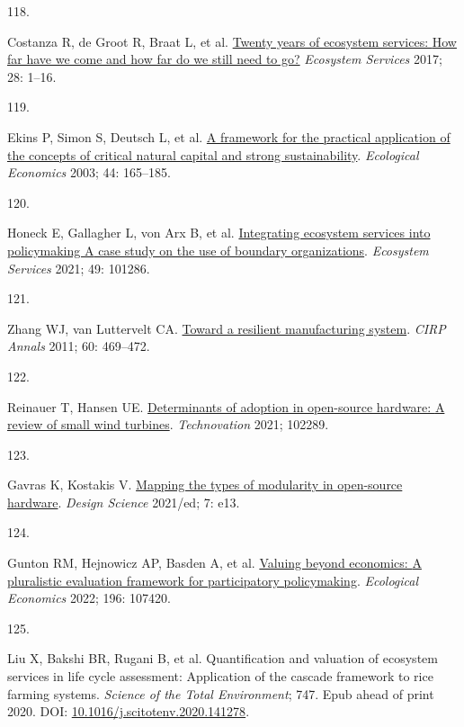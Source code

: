 \documentclass[
  12pt,
  a4paperpaper,
  onecolumn]{article}
\newlength{\cslhangindent}
\newlength{\csllabelwidth}
\newlength{\cslentryspacingunit} %
\newenvironment{CSLReferences}[2] %
 {%
  \setlength{\parindent}{0pt}
  \ifodd #1
  \let\oldpar\par
  \def\par{\hangindent=\cslhangindent\oldpar}
  \fi
  \setlength{\parskip}{#2\cslentryspacingunit}
 }%
 {}
\newcommand{\CSLLeftMargin}[1]{\parbox[t]{\csllabelwidth}{#1}}
\newcommand{\CSLRightInline}[1]{\parbox[t]{\linewidth - \csllabelwidth}{#1}\break}
\begin{document}
\begin{CSLReferences}{0}{0}
\leavevmode{}%
\CSLLeftMargin{118. }%
\CSLRightInline{Costanza R, de Groot R, Braat L, et al.
\href{https://doi.org/10.1016/j.ecoser.2017.09.008}{Twenty years of
ecosystem services: {How} far have we come and how far do we still need
to go?} \emph{Ecosystem Services} 2017; 28: 1--16.}

\leavevmode{}%
\CSLLeftMargin{119. }%
\CSLRightInline{Ekins P, Simon S, Deutsch L, et al.
\href{https://doi.org/10.1016/S0921-8009(02)00272-0}{A framework for the
practical application of the concepts of critical natural capital and
strong sustainability}. \emph{Ecological Economics} 2003; 44: 165--185.}

\leavevmode{}%
\CSLLeftMargin{120. }%
\CSLRightInline{Honeck E, Gallagher L, von Arx B, et al.
\href{https://doi.org/10.1016/j.ecoser.2021.101286}{Integrating
ecosystem services into policymaking \textendash{} {A} case study on the
use of boundary organizations}. \emph{Ecosystem Services} 2021; 49:
101286.}

\leavevmode{}%
\CSLLeftMargin{121. }%
\CSLRightInline{Zhang WJ, van Luttervelt CA.
\href{https://doi.org/10.1016/j.cirp.2011.03.041}{Toward a resilient
manufacturing system}. \emph{CIRP Annals} 2011; 60: 469--472.}

\leavevmode{}%
\CSLLeftMargin{122. }%
\CSLRightInline{Reinauer T, Hansen UE.
\href{https://doi.org/10.1016/j.technovation.2021.102289}{Determinants
of adoption in open-source hardware: {A} review of small wind turbines}.
\emph{Technovation} 2021; 102289.}

\leavevmode{}%
\CSLLeftMargin{123. }%
\CSLRightInline{Gavras K, Kostakis V.
\href{https://doi.org/10.1017/dsj.2021.11}{Mapping the types of
modularity in open-source hardware}. \emph{Design Science} 2021/ed; 7:
e13.}

\leavevmode{}%
\CSLLeftMargin{124. }%
\CSLRightInline{Gunton RM, Hejnowicz AP, Basden A, et al.
\href{https://doi.org/10.1016/j.ecolecon.2022.107420}{Valuing beyond
economics: {A} pluralistic evaluation framework for participatory
policymaking}. \emph{Ecological Economics} 2022; 196: 107420.}

\leavevmode{}%
\CSLLeftMargin{125. }%
\CSLRightInline{Liu X, Bakshi BR, Rugani B, et al. Quantification and
valuation of ecosystem services in life cycle assessment: {Application}
of the cascade framework to rice farming systems. \emph{Science of the
Total Environment}; 747. Epub ahead of print 2020. DOI:
\href{https://doi.org/10.1016/j.scitotenv.2020.141278}{10.1016/j.scitotenv.2020.141278}.}


\end{CSLReferences}
\end{document}

